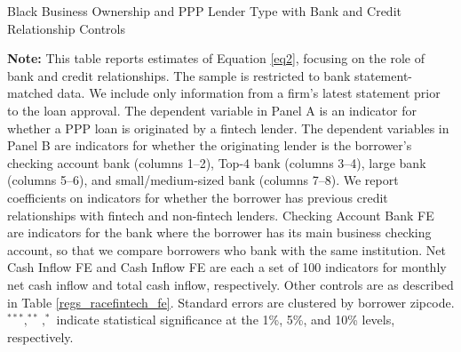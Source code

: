 \documentclass[11pt]{article}
\begin{document}
    \begin{table}[H]
    	\caption{Black Business Ownership and PPP Lender Type with Bank and Credit Relationship Controls} \label{racefintech}
    	\begin{adjustbox}{width=.85\linewidth, center}
    		
    	\end{adjustbox}
    	\begin{adjustbox}{width=\linewidth, center}
    		
    	\end{adjustbox}
    	\begin{minipage}{\linewidth} \medskip
    		\footnotesize{{\bf Note: }This table reports estimates of Equation \ref{eq2}, focusing on the role of bank and credit relationships. The sample is restricted to bank statement-matched data. We include only information from a firm's latest statement prior to the loan approval. The dependent variable in Panel A is an indicator for whether a PPP loan is originated by a fintech lender. The dependent variables in Panel B are indicators for whether the originating lender is the borrower's checking account bank (columns 1--2), Top-4 bank (columns 3--4), large bank (columns 5--6), and small/medium-sized bank (columns 7--8). We report coefficients on indicators for whether the borrower has previous credit relationships with fintech and non-fintech lenders. Checking Account Bank FE are indicators for the bank where the borrower has its main business checking account, so that we compare borrowers who bank with the same institution. Net Cash Inflow FE and Cash Inflow FE are each a set of 100 indicators for monthly net cash inflow and total cash inflow, respectively. Other controls are as described in Table \ref{regs_racefintech_fe}. Standard errors are clustered by borrower zipcode. $^{***}, ^{**}, ^{*}$ indicate statistical significance at the 1\%, 5\%, and 10\% levels, respectively.}
    	\end{minipage}
    \end{table}
    
\end{document}

